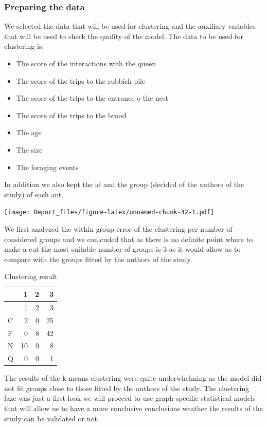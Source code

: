 \documentclass[
]{article}
\begin{document}
\hypertarget{preparing-the-data}{%
\subsubsection{Preparing the data}\label{preparing-the-data}}

We selected the data that will be used for clustering and the auxiliary
variables that will be used to check the quality of the model. The data
to be used for clustering is:

\begin{itemize}
\item
  The score of the interactions with the queen
\item
  The score of the trips to the rubbish pile
\item
  The score of the trips to the entrance o the nest
\item
  The score of the trips to the brood
\item
  The age
\item
  The size
\item
  The foraging events
\end{itemize}

In addition we also kept the id and the group (decided of the authors of
the study) of each ant.

\texttt{[image: Report\_files/figure-latex/unnamed-chunk-32-1.pdf]}

We first analyzed the within group error of the clustering per number of
considered groups and we conlcuded that as there is no definite point
where to make a cut the most suitable number of groups is 3 as it would
allow us to compare with the groups fitted by the authors of the study.

\begin{longtable}[]{@{}lrrr@{}}
\caption{Clustering result}\tabularnewline
\toprule
& 1 & 2 & 3\tabularnewline
\midrule
\endfirsthead
\toprule
& 1 & 2 & 3\tabularnewline
\midrule
\endhead
C & 2 & 0 & 25\tabularnewline
F & 0 & 8 & 42\tabularnewline
N & 10 & 0 & 8\tabularnewline
Q & 0 & 0 & 1\tabularnewline
\bottomrule
\end{longtable}

The results of the k-means clustering were quite underwhelming as the
model did not fit groups close to those fitted by the authors of the
study. The clustering faze was just a first look we will proceed to use
graph-specific statistical models that will allow us to have a more
conclusive conclusions weather the results of the study can be validated
or not.
\end{document}
